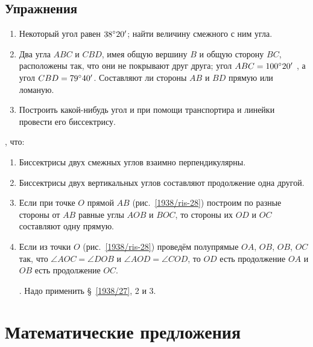 \documentclass[twoside]{book}
\begin{document}
\subsection*{Упражнения}

\begin{enumerate}

 \item
Некоторый угол равен $38\degree 20'$;
найти величину смежного с ним угла.

 \item
Два угла $ABC$ и $CBD$, имея общую вершину $B$ и общую сторону $BC$, расположены так, что они не покрывают друг друга;
угол $ABC = 100\degree20'$ , а угол $CBD = 79\degree 40'$.
Составляют ли стороны $AB$ и $BD$ прямую или ломаную.

 \item
Построить какой-нибудь угол и при помощи транспортира и линейки провести его биссектрису.

\end{enumerate}

\smallskip
{}, что:

\begin{enumerate}[resume]
 \item
Биссектрисы двух смежных углов взаимно перпендикулярны.

 \item
Биссектрисы двух вертикальных углов составляют продолжение одна другой.

 \item
Если при точке $O$ прямой $AB$ (рис.~\ref{1938/ris-28}) построим по разные стороны от $AB$ равные углы $AOB$ и $BOC$, то стороны их $OD$ и $OC$ составляют одну прямую.

 \item
Если из точки $O$ (рис.~\ref{1938/ris-28}) проведём полупрямые $OA$, $OB$, $OB$, $OC$ так, что $\angle AOC = \angle DOB$ и $\angle AOD=\angle COD$, то $OD$ есть продолжение $OA$ и $OB$ есть продолжение $OC$.

\smallskip
{}.
Надо применить §~\ref{1938/27}, 2 и 3.

\end{enumerate}

\section{Математические предложения}
\end{document}
